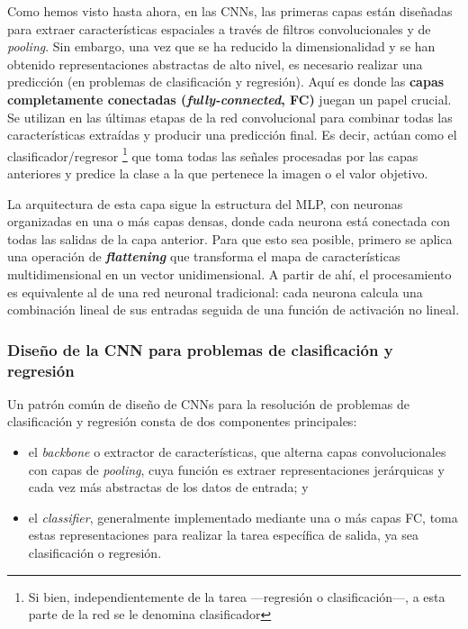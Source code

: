 Como hemos visto hasta ahora, en las CNNs, las primeras capas están diseñadas para extraer características
espaciales a través de filtros convolucionales y de \textit{pooling}. Sin embargo, una vez que se ha reducido 
la dimensionalidad y se han obtenido representaciones abstractas de alto nivel, es necesario realizar una 
predicción (en problemas de clasificación y regresión). 
Aquí es donde las \textbf{capas completamente conectadas (\textit{fully-connected}, FC)} juegan un papel 
crucial. Se utilizan en las últimas etapas de la red convolucional para combinar todas las características 
extraídas y producir una predicción final. Es decir, actúan como el clasificador/regresor
\footnote{
    Si bien, independientemente de la tarea ---regresión o clasificación---, a esta parte de la red se le 
    denomina clasificador
} 
que toma todas las señales procesadas por las capas anteriores y predice la clase a la que pertenece la imagen 
o el valor objetivo. 

La arquitectura de esta capa sigue la estructura del MLP, con neuronas organizadas en una o más capas densas, 
donde cada neurona está conectada con todas las salidas de la capa anterior. Para que esto sea posible, 
primero se aplica una operación de \textbf{\textit{flattening}} que transforma el mapa de características 
multidimensional en un vector unidimensional. A partir de ahí, el procesamiento es equivalente al de una red 
neuronal tradicional: cada neurona calcula una combinación lineal de sus entradas seguida de una función de 
activación no lineal.


\subsubsection{Diseño de la CNN para problemas de clasificación y regresión}

Un patrón común de diseño de CNNs para la resolución de problemas de clasificación y regresión consta de dos
componentes principales:

\begin{itemize}

    \item el \textit{backbone} o extractor de características, que alterna capas convolucionales con capas de
    \textit{pooling}, cuya función es extraer representaciones jerárquicas y cada vez más abstractas de los 
    datos de entrada; y

    \item el \textit{classifier}, generalmente implementado mediante una o más capas FC, 
    toma estas representaciones para realizar la tarea específica de salida, ya sea clasificación o regresión.

\end{itemize}

